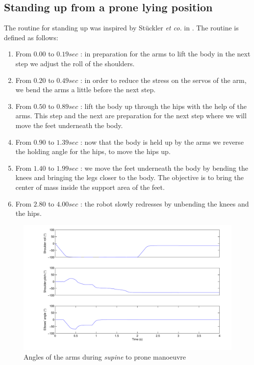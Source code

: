 \subsection{Standing up from a prone lying position}
The routine for standing up was inspired by Stückler \emph{et co.} in \cite{Stuckler06}. The routine is defined as follows:\begin{enumerate}
\item From $0.00$ to $0.19sec$ : in preparation for the arms to lift the body in the next step we adjust the roll of the shoulders.

\item From $0.20$ to $0.49sec$ : in order to reduce the stress on the servos of the arm, we bend the arms a little before the next step.

\item From $0.50$ to $0.89sec$ : lift the body up through the hips with the help of the arms. This step and the next are preparation for the next step where we will move the feet underneath the body.

\item From $0.90$ to $1.39sec$ : now that the body is held up by the arms we reverse the holding angle for the hips, to move the hips up. 

\item From $1.40$ to $1.99sec$ :  we move the feet underneath the body by bending the knees and bringing the legs closer to the body. The objective is to bring the center of mass inside the support area of the feet.

\item From $2.80$ to $4.00sec$ : the robot slowly redresses by unbending the knees and the hips. 
\end{enumerate}

\begin{figure}[htp]
\center
    \includegraphics[width = \textwidth]{figures/prone2standArms}
    \caption[Angles of the arms during \emph{supine} to prone manoeuvre]{Angles of the arms during \emph{supine} to prone manoeuvre}
    \label{fig:prone2standArms}
\end{figure}

